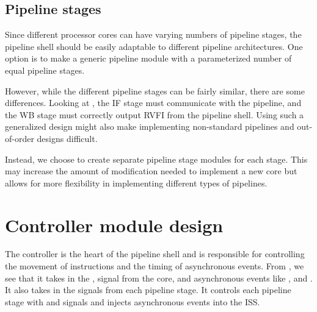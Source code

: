 




\subsection{Pipeline stages}
Since different processor cores can have varying numbers of pipeline stages, the pipeline shell should be easily adaptable to different pipeline architectures. One option is to make a generic pipeline module with a parameterized number of equal pipeline stages. 

However, while the different pipeline stages can be fairly similar, there are some differences. Looking at , the IF stage must communicate with the pipeline, and the WB stage must correctly output RVFI from the pipeline shell. Using such a generalized design might also make implementing non-standard pipelines and out-of-order designs difficult.

Instead, we choose to create separate pipeline stage modules for each stage. This may increase the amount of modification needed to implement a new core but allows for more flexibility in implementing different types of pipelines.



\section{Controller module design}

The controller is the heart of the pipeline shell and is responsible for controlling the movement of instructions and the timing of asynchronous events. From , we see that it takes in the ,  signal from the core, and asynchronous events like , and . It also takes in the  signals from each pipeline stage. It controls each pipeline stage with  and  signals and injects asynchronous events into the ISS.

